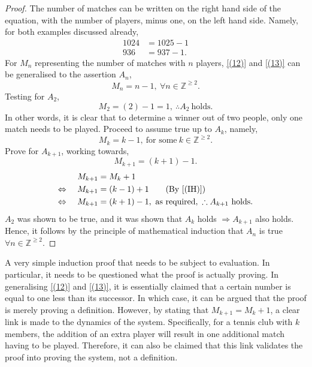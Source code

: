 \documentclass{article}
\begin{document}
\begin{proof}
    The number of matches can be written on the right hand side of the equation, with the number of players, minus one, on the left hand side. Namely, for both examples discussed already,
    \begin{align}
        \label{(12)} 1024 &= 1025-1 \\
        \label{(13)} 936 &= 937-1.
    \end{align}
    For $M_n$ representing the number of matches with $n$ players, \eqref{(12)} and \eqref{(13)} can be generalised to the assertion $A_n$,
    \begin{equation}
        M_n = n-1,\ \forall n \in \mathbb{Z}^{\geq2}.
    \end{equation}
    Testing for $A_2$,
    \begin{equation*}
        M_2 = \left(2\right)-1 = 1,\ \therefore A_2\ \text{holds}.
    \end{equation*}
    In other words, it is clear that to determine a winner out of two people, only one match needs to be played. Proceed to assume true up to $A_k$, namely,
    \begin{equation*} \label{(IH)}
        M_k = k-1,\ \text{for some}\ k \in \mathbb{Z}^{\geq2}.
        \tag{IH}
    \end{equation*}
    Prove for $A_{k+1}$, working towards,
    \begin{equation*}
        M_{k+1} = \left(k+1\right)-1.
    \end{equation*}
    \begin{alignat*}{2}
        && M_{k+1} &= M_k + 1 \\
        \Leftrightarrow&&\ M_{k+1} &= \left(k-1\right) + 1 \tag{By \eqref{(IH)}}\\
        \Leftrightarrow&& M_{k+1} &= \left(k+1\right) - 1,\ \text{as required},\ \therefore A_{k+1}\ \text{holds}.
    \end{alignat*}
    $A_2$ was shown to be true, and it was shown that $A_k$ holds $\Rightarrow A_{k+1}$ also holds. Hence, it follows by the principle of mathematical induction that $A_n$ is true $\forall n \in \mathbb{Z}^{\geq2}$.
\end{proof}

A very simple induction proof that needs to be subject to evaluation. In particular, it needs to be questioned what the proof is actually proving. In generalising \eqref{(12)} and \eqref{(13)}, it is essentially claimed that a certain number is equal to one less than its successor. In which case, it can be argued that the proof is merely proving a definition. However, by stating that $M_{k+1}=M_k +1$, a clear link is made to the dynamics of the system. Specifically, for a tennis club with $k$ members, the addition of an extra player will result in one additional match having to be played. Therefore, it can also be claimed that this link validates the proof into proving the system, not a definition.
\end{document}
